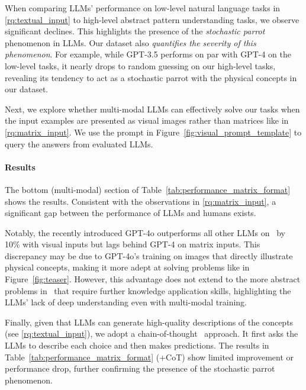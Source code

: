 When comparing LLMs' performance on low-level natural language tasks in \ref{rq:textual_input} to  high-level abstract pattern understanding tasks, we observe significant declines.
This highlights the presence of the \emph{stochastic parrot} phenomenon in LLMs. 
Our dataset also \emph{quantifies the severity of this phenomenon}.
For example, while GPT-3.5 performs on par with GPT-4 on the low-level tasks, it nearly drops to random guessing on our high-level tasks, revealing its tendency to act as a stochastic parrot with the physical concepts in our dataset.







\label{rq:visual_input}



Next, we explore whether multi-modal LLMs can effectively solve our tasks when the input examples are presented as visual images rather than matrices like in \ref{rq:matrix_input}. We use the prompt in Figure~\ref{fig:visual_prompt_template} to query the answers from evaluated LLMs.


\paragraph{Results}
The bottom (multi-modal) section of Table~\ref{tab:performance_matrix_format} shows the results.
Consistent with the observations in \ref{rq:matrix_input}, a significant gap between the performance of LLMs and humans exists.

Notably, the recently introduced GPT-4o outperforms all other LLMs on \coredatasetns\ by 10\% with visual inputs but lags behind GPT-4 on matrix inputs. 
This discrepancy may be due to GPT-4o's training on images that directly illustrate physical concepts, making it more adept at solving problems like in Figure~\ref{fig:teaser}. However, this advantage does not extend to the more abstract problems in \harddatasetns\ that require further knowledge application skills, highlighting the LLMs' lack of deep understanding even with multi-modal training.

Finally, given that LLMs can generate high-quality descriptions of the concepts (see \ref{rq:textual_input}), we adopt a chain-of-thought~\cite{wei2022chain} approach.
It first asks the LLMs to describe each choice and then makes predictions.
The results in Table~\ref{tab:performance_matrix_format} (+CoT) show limited improvement or performance drop, further confirming the presence of the stochastic parrot phenomenon.






